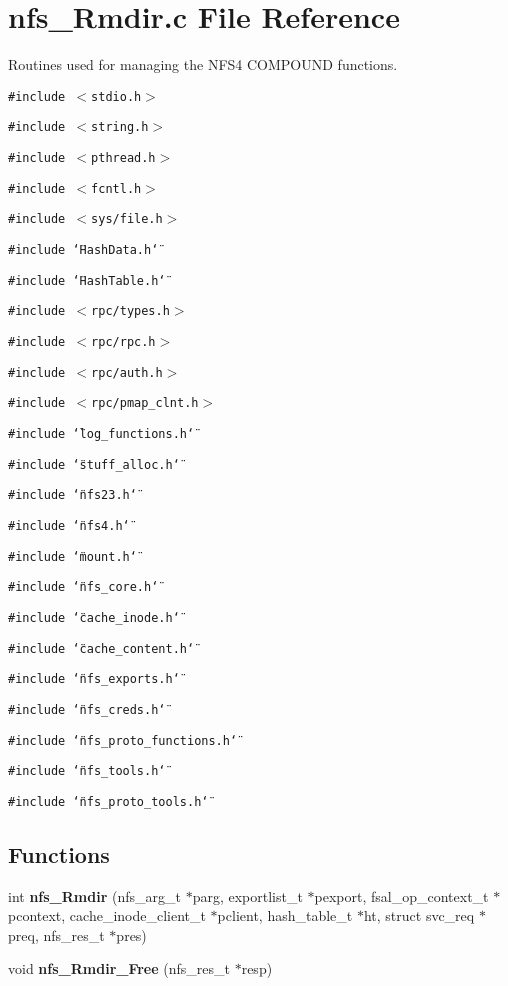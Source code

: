 \section{nfs\_\-Rmdir.c File Reference}
\label{nfs__Rmdir_8c}
Routines used for managing the NFS4 COMPOUND functions. 

{\tt \#include $<$stdio.h$>$}\par
{\tt \#include $<$string.h$>$}\par
{\tt \#include $<$pthread.h$>$}\par
{\tt \#include $<$fcntl.h$>$}\par
{\tt \#include $<$sys/file.h$>$}\par
{\tt \#include \char`\"{}Hash\-Data.h\char`\"{}}\par
{\tt \#include \char`\"{}Hash\-Table.h\char`\"{}}\par
{\tt \#include $<$rpc/types.h$>$}\par
{\tt \#include $<$rpc/rpc.h$>$}\par
{\tt \#include $<$rpc/auth.h$>$}\par
{\tt \#include $<$rpc/pmap\_\-clnt.h$>$}\par
{\tt \#include \char`\"{}log\_\-functions.h\char`\"{}}\par
{\tt \#include \char`\"{}stuff\_\-alloc.h\char`\"{}}\par
{\tt \#include \char`\"{}nfs23.h\char`\"{}}\par
{\tt \#include \char`\"{}nfs4.h\char`\"{}}\par
{\tt \#include \char`\"{}mount.h\char`\"{}}\par
{\tt \#include \char`\"{}nfs\_\-core.h\char`\"{}}\par
{\tt \#include \char`\"{}cache\_\-inode.h\char`\"{}}\par
{\tt \#include \char`\"{}cache\_\-content.h\char`\"{}}\par
{\tt \#include \char`\"{}nfs\_\-exports.h\char`\"{}}\par
{\tt \#include \char`\"{}nfs\_\-creds.h\char`\"{}}\par
{\tt \#include \char`\"{}nfs\_\-proto\_\-functions.h\char`\"{}}\par
{\tt \#include \char`\"{}nfs\_\-tools.h\char`\"{}}\par
{\tt \#include \char`\"{}nfs\_\-proto\_\-tools.h\char`\"{}}\par
\subsection*{Functions}
\begin{CompactItemize}
\item 
int {\bf nfs\_\-Rmdir} (nfs\_\-arg\_\-t $\ast$parg, exportlist\_\-t $\ast$pexport, fsal\_\-op\_\-context\_\-t $\ast$pcontext, cache\_\-inode\_\-client\_\-t $\ast$pclient, hash\_\-table\_\-t $\ast$ht, struct svc\_\-req $\ast$preq, nfs\_\-res\_\-t $\ast$pres)
\item 
void {\bf nfs\_\-Rmdir\_\-Free} (nfs\_\-res\_\-t $\ast$resp)
\end{CompactItemize}


